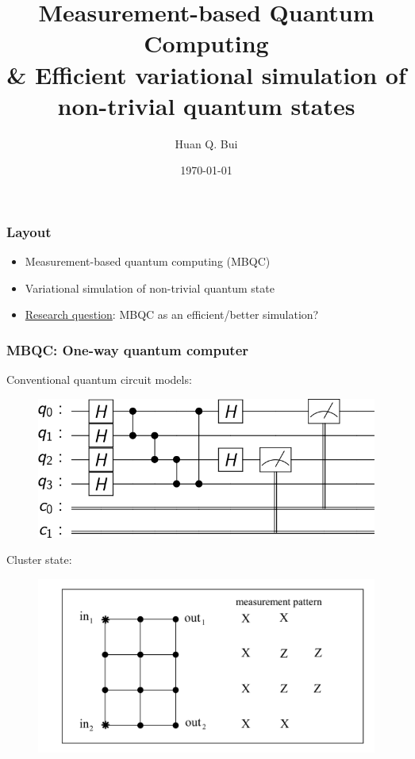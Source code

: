 \documentclass{beamer}
\title{Measurement-based Quantum Computing \\ \& Efficient variational simulation of non-trivial quantum states}
\author[Huan Q. Bui] %
{Huan Q. Bui}
\institute[Perimeter Institute] %
{
	
	Advisor: Timothy Hsieh
	\and
	Perimeter Institute for Theoretical Physics
}
\date{\today}
\theoremstyle{definition}
\begin{document}
 
\frame{\titlepage}




\begin{frame}

\frametitle{Layout}

\begin{itemize}
	\item Measurement-based quantum computing (MBQC)
	\pause
	\item Variational simulation of non-trivial quantum state
	\pause
	\item \underline{Research question}: MBQC as an efficient/better simulation?
\end{itemize}

\end{frame}





\begin{frame}
\frametitle{MBQC: One-way quantum computer \cite{MBQC}}

Conventional quantum circuit models:

\begin{figure}[!htb]
	\includegraphics[scale=0.25]{circuit}
\end{figure}

\pause
Cluster state: \cite{jozsa}

\begin{figure}[!htb]
	\includegraphics[scale=0.18]{fig8}
\end{figure}







\end{frame}
\end{document}
